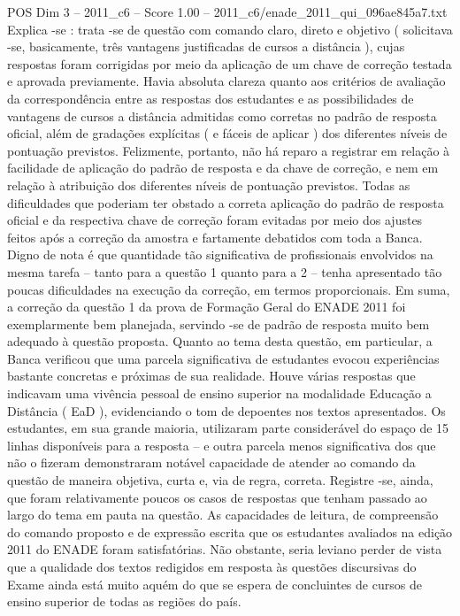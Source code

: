 \begin{textsample}{POS Dim 3 – 2011\_c6 – Score 1.00 – 2011\_c6/enade\_2011\_qui\_096ae845a7.txt}
Explica -se : trata -se de questão com comando claro, direto e objetivo ( solicitava -se, basicamente, três vantagens justificadas de cursos a distância ), cujas respostas foram corrigidas por meio da aplicação de um chave de correção testada e aprovada previamente.
Havia absoluta clareza quanto aos critérios de avaliação da correspondência entre as respostas dos estudantes e as possibilidades de vantagens de cursos a distância admitidas como corretas no padrão de resposta oficial, além de gradações explícitas ( e fáceis de aplicar ) dos diferentes níveis de pontuação previstos.
Felizmente, portanto, não há reparo a registrar em relação à facilidade de aplicação do padrão de resposta e da chave de correção, e nem em relação à atribuição dos diferentes níveis de pontuação previstos.
Todas as dificuldades que poderiam ter obstado a correta aplicação do padrão de resposta oficial e da respectiva chave de correção foram evitadas por meio dos ajustes feitos após a correção da amostra e fartamente debatidos com toda a Banca.
Digno de nota é que quantidade tão significativa de profissionais envolvidos na mesma tarefa – tanto para a questão 1 quanto para a 2 – tenha apresentado tão poucas dificuldades na execução da correção, em termos proporcionais.
Em suma, a correção da questão 1 da prova de Formação Geral do ENADE 2011 foi exemplarmente bem planejada, servindo -se de padrão de resposta muito bem adequado à questão proposta.
Quanto ao tema desta questão, em particular, a Banca verificou que uma parcela significativa de estudantes evocou experiências bastante concretas e próximas de sua realidade.
Houve várias respostas que indicavam uma vivência pessoal de ensino superior na modalidade Educação a Distância ( EaD ), evidenciando o tom de depoentes nos textos apresentados.
Os estudantes, em sua grande maioria, utilizaram parte considerável do espaço de 15 linhas disponíveis para a resposta – e outra parcela menos significativa dos que não o fizeram demonstraram notável capacidade de atender ao comando da questão de maneira objetiva, curta e, via de regra, correta.
Registre -se, ainda, que foram relativamente poucos os casos de respostas que tenham passado ao largo do tema em pauta na questão.
As capacidades de leitura, de compreensão do comando proposto e de expressão escrita que os estudantes avaliados na edição 2011 do ENADE foram satisfatórias.
Não obstante, seria leviano perder de vista que a qualidade dos textos redigidos em resposta às questões discursivas do Exame ainda está muito aquém do que se espera de concluintes de cursos de ensino superior de todas as regiões do país.

\end{textsample}
